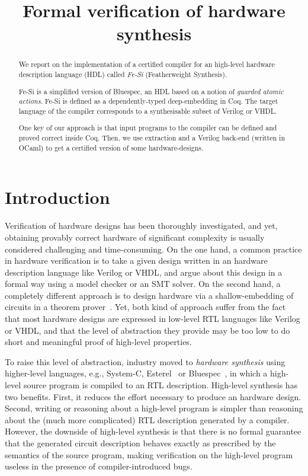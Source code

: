 \documentclass[preprint]{sigplanconf}
\title{Formal verification of hardware synthesis}
\begin{document}
\maketitle

\begin{abstract}
  We report on the implementation of a certified compiler for an
  high-level hardware description language (HDL) called \emph{Fe-Si}
  (Featherweight Synthesis).

  Fe-Si is a simplified version of Bluespec, an HDL based on a notion
  of \emph{guarded atomic actions}. Fe-Si is defined as a
  dependently-typed deep-embedding in Coq. The target language of the
  compiler corresponds to a synthesisable subset of Verilog or VHDL.
  
  One key of our approach is that input programs to the compiler can
  be defined and proved correct inside Coq. Then, we use extraction
  and a Verilog back-end (written in OCaml) to get a certified version
  of some hardware-designs.
\end{abstract}

\section*{Introduction}
Verification of hardware designs has been thoroughly investigated, and
yet, obtaining provably correct hardware of significant complexity is
usually considered challenging and time-consuming. 
%
On the one hand, a common practice in hardware verification is to  take a given design
written in an hardware description language like Verilog or VHDL,
and argue about this design in a formal way using a model checker or
an SMT solver. 
%
On the second hand, a completely different approach is to design hardware via a
shallow-embedding of circuits in a theorem
prover~\cite{hanna-veritas,UCAM-CL-TR-77,hunt89,vamp,certifying-circuits-in-type-theory}. 
%
Yet, both kind of approach suffer from the fact that most hardware
designs are expressed in low-level RTL languages like Verilog or 
VHDL, and that the level of abstraction they provide may be too low to
do short and meaningful proof of high-level properties. 

\medskip

To raise this level of abstraction, industry moved to \emph{hardware
  synthesis} using higher-level languages, e.g., System-C,
Esterel~\cite{DBLP:conf/birthday/Berry00} or
Bluespec~\cite{bluespec}, in which a high-level source program is
compiled to an RTL description. 
%
High-level synthesis has two benefits. 
%
First, it reduces the effort necessary to produce an hardware design.
%
Second, writing or reasoning about a high-level program is simpler
than reasoning about the (much more complicated) RTL description
generated by a compiler.
%
However, the downside of high-level synthesis is that there is no
formal guarantee that the generated circuit description behaves
exactly as prescribed by the semantics of the source
program, making verification on the high-level program useless in the
presence of compiler-introduced bugs.
%
\end{document}

